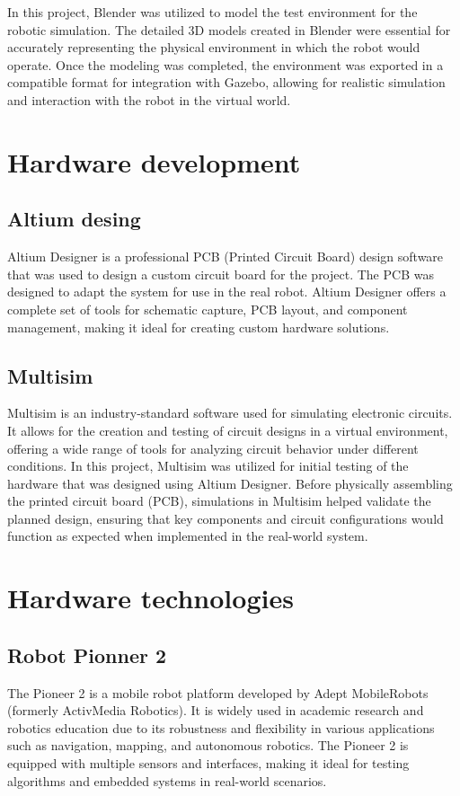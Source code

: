 \documentclass[../../monografia.tex]{subfiles}
\begin{document}
In this project, Blender was utilized to model the test environment for the robotic simulation. The detailed 3D models created in Blender were essential for accurately representing the physical environment in which the robot would operate. Once the modeling was completed, the environment was exported in a compatible format for integration with Gazebo, allowing for realistic simulation and interaction with the robot in the virtual world.

\section{Hardware development}
\subsection{Altium desing}

Altium Designer is a professional PCB (Printed Circuit Board) design software that was used to design a custom circuit board for the project. The PCB was designed to adapt the system for use in the real robot. Altium Designer offers a complete set of tools for schematic capture, PCB layout, and component management, making it ideal for creating custom hardware solutions.
\subsection{Multisim}

Multisim is an industry-standard software used for simulating electronic circuits. It allows for the creation and testing of circuit designs in a virtual environment, offering a wide range of tools for analyzing circuit behavior under different conditions. In this project, Multisim was utilized for initial testing of the hardware that was designed using Altium Designer. Before physically assembling the printed circuit board (PCB), simulations in Multisim helped validate the planned design, ensuring that key components and circuit configurations would function as expected when implemented in the real-world system.

\section{Hardware technologies}
\subsection{Robot Pionner 2}

The Pioneer 2 is a mobile robot platform developed by Adept MobileRobots (formerly ActivMedia Robotics). It is widely used in academic research and robotics education due to its robustness and flexibility in various applications such as navigation, mapping, and autonomous robotics. The Pioneer 2 is equipped with multiple sensors and interfaces, making it ideal for testing algorithms and embedded systems in real-world scenarios.
\end{document}
